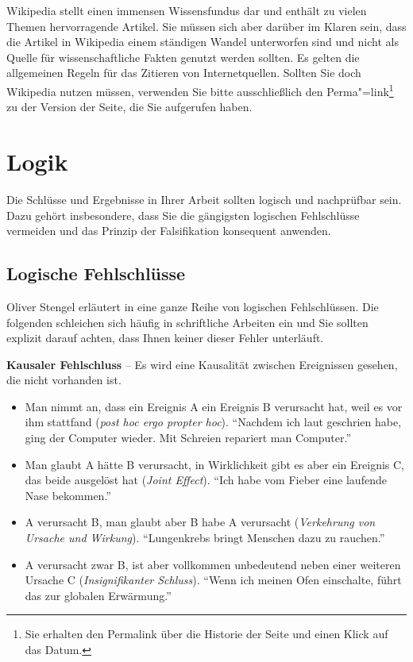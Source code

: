 \documentclass[a4paper,11pt,headings=normal]{scrartcl}
\begin{document}
Wikipedia stellt einen immensen Wissensfundus dar und enthält zu vielen Themen hervorragende Artikel. Sie müssen sich aber darüber im Klaren sein, dass die Artikel in Wikipedia einem ständigen Wandel unterworfen sind und nicht als Quelle für wissenschaftliche Fakten genutzt werden sollten. Es gelten die allgemeinen Regeln für das Zitieren von Internetquellen. Sollten Sie doch Wikipedia nutzen müssen, verwenden Sie bitte ausschließlich den Perma"=link\footnote{Sie erhalten den Permalink über die Historie der Seite und einen Klick auf das Datum.} zu der Version der Seite, die Sie aufgerufen haben.


\section{Logik}

Die Schlüsse und Ergebnisse in Ihrer Arbeit sollten logisch und nachprüfbar sein. Dazu gehört insbesondere, dass Sie die gängigsten logischen Fehlschlüsse vermeiden und das Prinzip der Falsifikation konsequent anwenden.

\subsection{Logische Fehlschlüsse}
Oliver Stengel erläutert in \autocite{Stengel2005} eine ganze Reihe von logischen Fehlschlüssen. Die folgenden schleichen sich häufig in schriftliche Arbeiten ein und Sie sollten explizit darauf achten, dass Ihnen keiner dieser Fehler unterläuft.

\vspace{0.3cm}\noindent\textbf{Kausaler Fehlschluss} -- Es wird eine Kausalität zwischen Ereignissen gesehen, die nicht vorhanden ist.
  \begin{itemize}
     \item Man nimmt an, dass ein Ereignis A ein Ereignis B verursacht hat, weil es vor ihm stattfand (\textit{post hoc ergo propter hoc}). "`Nachdem ich laut geschrien habe, ging der Computer wieder. Mit Schreien repariert man Computer."'
     \item Man glaubt A hätte B verursacht, in Wirklichkeit gibt es aber ein Ereignis C, das beide ausgelöst hat (\textit{Joint Effect}). "`Ich habe vom Fieber eine laufende Nase bekommen."'
     \item A verursacht B, man glaubt aber B habe A verursacht (\textit{Verkehrung von Ursache und Wirkung}). "`Lungenkrebs bringt Menschen dazu zu rauchen."'
     \item A verursacht zwar B, ist aber vollkommen unbedeutend neben einer weiteren Ursache C (\textit{Insignifikanter Schluss}). "`Wenn ich meinen Ofen einschalte, führt das zur globalen Erwärmung."'
  \end{itemize}
\end{document}
